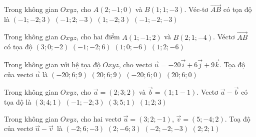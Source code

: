 

\begin{ex}%
	Trong không gian $Oxyz$, cho $A(2;-1;0)$ và $B(1;1;-3)$. Véc-tơ $\overrightarrow{AB}$ có tọa độ là 
	\choice 
		 {$(-1;-2;3)$}
		{\True $(-1;2;-3)$} 
		{$(1;-2;3)$} 
		 {$(-1;-2;-3)$}
\end{ex}

\begin{ex}%
	Trong không gian $Oxyz$, cho hai điểm $A(1;-1;2)$ và $B(2;1;-4)$. Véctơ  $\overrightarrow{AB}$ có tọa độ
	\choice 
		 {$(3;0;-2)$}
		{$(-1;-2;6)$} 
		 {$(1;0;-6)$}
		{\True  $(1;2;-6)$}
\end{ex}

\begin{ex}%
	Trong không gian với  hệ tọa độ $Oxyz$, cho vectơ $\overrightarrow{u} = -20 \overrightarrow{i} + 6 \overrightarrow{j} + 9 \overrightarrow{k}$. Tọa độ của vectơ $\overrightarrow{u}$ là
	 \choice
		{\True $(-20;6;9)$} 
		{$(20;6;9)$} 
		 {$(-20;6;0)$}
		 {$(20;6;0)$}
\end{ex}

\begin{ex}%
	Trong không gian $Oxyz$, cho $\overrightarrow{a}=(2;3;2)$ và $\overrightarrow{b}=(1;1-1)$. Vectơ $\overrightarrow{a}-\overrightarrow{b}$ có tọa độ là 
	\choice 
		{$(3;4;1)$} 
		 {$(-1;-2;3)$}
		{$(3;5;1)$} 
		 {\True $(1;2;3)$}
\end{ex}

\begin{ex}%
	Trong không gian $Oxyz$, cho  hai vectơ $\overrightarrow{u}=(3;2;-1)$, $\overrightarrow{v}=(5;-4;2)$. Toạ độ của vectơ $\overrightarrow{u}-\overrightarrow{v}$~là
	 \choice
		{\True  $(-2;6;-3)$}
		 {$(2;-6;3)$}
		 {$(-2;-2;-3)$}
		 {$(2;2;1)$}
\end{ex}

